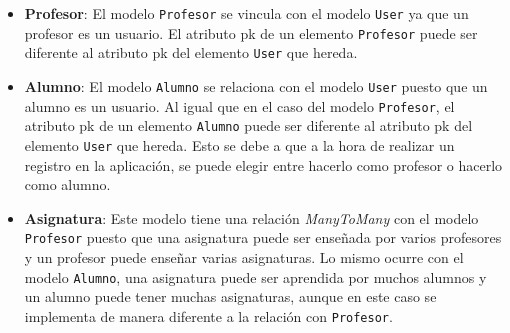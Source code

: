 \documentclass[a4paper, 12pt]{book}
\begin{document}
\begin{itemize}
  \item {\bfseries Profesor}: El modelo \texttt{Profesor} se vincula con el modelo \texttt{User} ya que un profesor es un usuario. El atributo pk de un 
  elemento \texttt{Profesor} puede ser diferente al atributo pk del elemento \texttt{User} que hereda.
  \item {\bfseries Alumno}: El modelo \texttt{Alumno} se relaciona con el modelo \texttt{User} puesto que un alumno es un usuario. Al igual que en el caso 
  del modelo \texttt{Profesor}, el atributo pk de un elemento \texttt{Alumno} puede ser diferente al atributo pk del elemento \texttt{User} que hereda. 
  Esto se debe a que a la hora de realizar un registro en la aplicaci\'on, se puede elegir entre hacerlo como profesor o hacerlo como alumno.
  \item {\bfseries Asignatura}: Este modelo tiene una relaci\'on \textit{ManyToMany} con el modelo \texttt{Profesor} puesto que una asignatura puede ser 
  ense\~nada por varios profesores y un profesor puede ense\~nar varias asignaturas. Lo mismo ocurre con el modelo \texttt{Alumno}, una asignatura puede 
  ser aprendida por muchos alumnos y un alumno puede tener muchas asignaturas, aunque en este caso se implementa de manera diferente a la relaci\'on con 
  \texttt{Profesor}.
  

\end{itemize}
\end{document}
